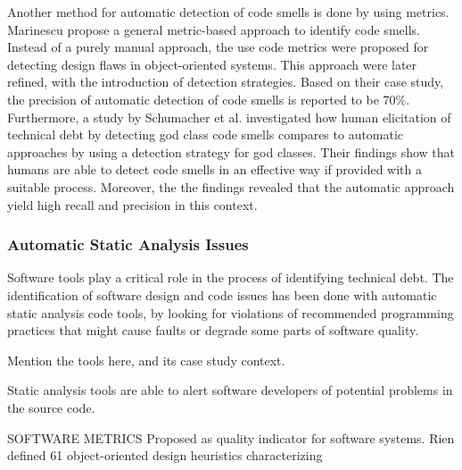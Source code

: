 Another method for automatic detection of code smells is done by using metrics. Marinescu\cite{marinescu2001detecting} propose a general metric-based approach to identify code smells. Instead of a purely manual approach, the use code metrics were proposed for detecting design flaws in object-oriented systems. This approach were later refined, with the introduction of detection strategies\cite{marinescu2004detection}. Based on their case study, the precision of automatic detection of code smells is reported to be 70\%. Furthermore, a study by Schumacher et al.\cite{schumacher2010building} investigated how human elicitation of technical debt by detecting god class code smells compares to automatic approaches by using a detection strategy for god classes. Their findings show that humans are able to detect code smells in an effective way if provided with a suitable process. Moreover, the the findings revealed that the automatic approach yield high recall and precision in this context. 



\subsubsection{Automatic Static Analysis Issues}
Software tools play a critical role in the process of identifying technical debt. The identification of software design and code issues has been done with automatic static analysis code tools, by looking for violations of recommended programming practices that might cause faults or degrade some parts of software quality. 

Mention the tools here, and its case study context.


Static analysis tools are able to alert software developers of potential problems in the source code. 
 



SOFTWARE METRICS
Proposed as quality indicator for software systems. 
Rien defined 61 object-oriented design heuristics characterizing 


